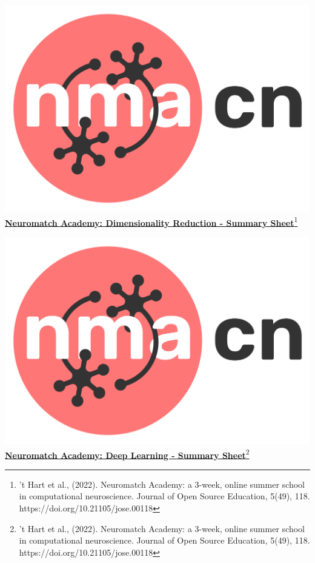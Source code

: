 \documentclass[10pt,a4paper]{article}
\begin{document}
\begin{multicols}{3}

\end{multicols}
\includegraphics[scale=0.03]{Figures/NMACN.png}\href{https://compneuro.neuromatch.io/tutorials/intro.html}{\textbf{\Huge{Neuromatch Academy: Dimensionality Reduction - Summary Sheet}}\footnote{’t Hart et al., (2022). Neuromatch Academy: a 3-week, online summer school in computational neuroscience. Journal of Open Source Education, 5(49), 118. https://doi.org/10.21105/jose.00118}}
\begin{multicols}{3}

\end{multicols}
\newpage
\includegraphics[scale=0.03]{Figures/NMACN.png}\href{https://compneuro.neuromatch.io/tutorials/intro.html}{\textbf{\Huge{Neuromatch Academy: Deep Learning - Summary Sheet}}\footnote{’t Hart et al., (2022). Neuromatch Academy: a 3-week, online summer school in computational neuroscience. Journal of Open Source Education, 5(49), 118. https://doi.org/10.21105/jose.00118}}
\begin{multicols}{3}

\end{multicols}
\end{document}
